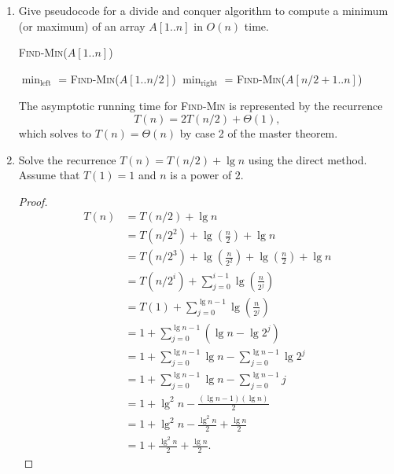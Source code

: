\documentclass[letterpaper,11pt]{article}
\begin{document}
\thispagestyle{plain}


 \\

 \\

\begin{enumerate}
\item Give pseudocode for a divide and conquer algorithm to compute a minimum (or maximum) of an array $A[1..n]$ in $O(n)$ time.

\begin{algorithm}[!h]
\textsc{Find-Min}($A[1..n]$)
\begin{algorithmic}[1]
\State {}
\EndIf
\State $\min_{\mathrm{left}}$ = \textsc{Find-Min}($A[1..n/2]$)
\State $\min_{\mathrm{right}}$ = \textsc{Find-Min}($A[n/2+1..n]$)
\State {}
\end{algorithmic}
\end{algorithm}

The asymptotic running time for \textsc{Find-Min} is represented by the recurrence \[T(n) = 2T(n/2) + \Theta(1),\] which solves to $T(n) = \Theta(n)$ by case 2 of the master theorem.

\newpage
\item Solve the recurrence $T(n) = T(n/2) + \lg n$ using the direct method.\\

Assume that $T(1) = 1$ and $n$ is a power of $2$.

\begin{proof}
\begin{align*}
T(n) &= T(n/2) + \lg n\\
     &= T(n/2^2) + \lg\left(\frac{n}{2}\right) + \lg n\\
     &= T(n/2^3) + \lg\left(\frac{n}{2^2}\right) + \lg\left(\frac{n}{2}\right) + \lg n\\
     &= T(n/2^i) + \sum_{j=0}^{i-1} \lg \left(\frac{n}{2^j}\right)\\
     &= T(1) + \sum_{j=0}^{\lg n - 1}\lg \left(\frac{n}{2^j}\right)\\
     &= 1 + \sum_{j=0}^{\lg n - 1}\left(\lg n - \lg 2^j\right)\\
     &= 1 + \sum_{j=0}^{\lg n - 1}\lg n - \sum_{j=0}^{\lg n - 1}\lg 2^j\\
     &= 1 + \sum_{j=0}^{\lg n - 1}\lg n - \sum_{j=0}^{\lg n - 1} j\\
     &= 1 + \lg^2 n - \frac{(\lg n -1)(\lg n)}{2}\\
     &= 1 + \lg^2 n - \frac{\lg^2n}{2} + \frac{\lg n}{2}\\
     &= 1 + \frac{\lg^2 n}{2} + \frac{\lg n}{2}.
\end{align*}
\end{proof}


\end{enumerate}
\end{document}

